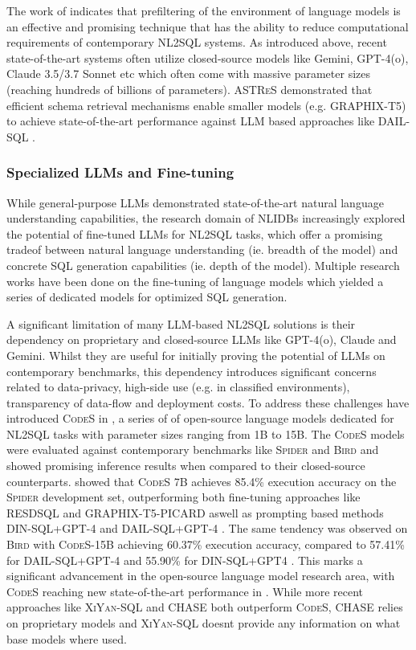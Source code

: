 The work of \citeauthor{RetAug} indicates that prefiltering of the environment of language models is an effective
and promising technique that has the ability to reduce computational requirements of contemporary NL2SQL systems.
As introduced above, recent state-of-the-art systems often utilize closed-source models like Gemini, GPT-4(o), Claude 3.5/3.7
Sonnet etc which often come with massive parameter sizes (reaching hundreds of billions of parameters). \textsc{ASTReS}
demonstrated that efficient schema retrieval mechanisms enable smaller models (e.g. GRAPHIX-T5) to achieve state-of-the-art
performance against LLM based approaches like DAIL-SQL \citep{DAIL-SQL, RetAug}.

\subsubsection{Specialized LLMs and Fine-tuning}

While general-purpose LLMs demonstrated state-of-the-art natural language understanding capabilities, the research
domain of NLIDBs increasingly explored the potential of fine-tuned LLMs for NL2SQL tasks, which offer a promising
tradeof between natural language understanding (ie. breadth of the model) and concrete SQL generation capabilities
(ie. depth of the model). Multiple research works have been done on the fine-tuning of language models which
yielded a series of dedicated models for optimized SQL generation.

A significant limitation of many LLM-based NL2SQL solutions is their dependency on proprietary and closed-source
LLMs like GPT-4(o), Claude and Gemini. Whilst they are useful for initially proving the potential of LLMs on
contemporary benchmarks, this dependency introduces significant concerns related to data-privacy, high-side use 
(e.g. in classified environments), transparency of data-flow and deployment costs. To address these challenges
\cite{CodeS} have introduced \textsc{CodeS} in \citeyear{CodeS}, a series of of open-source language models dedicated
for NL2SQL tasks with parameter sizes ranging from 1B to 15B. The \textsc{CodeS} models were evaluated against
contemporary benchmarks like \textsc{Spider} and \textsc{Bird} and showed promising inference results when compared
to their closed-source counterparts. \cite{CodeS} showed that \textsc{CodeS} 7B achieves 85.4\% execution accuracy
on the \textsc{Spider} development set, outperforming both fine-tuning approaches like RESDSQL and GRAPHIX-T5-PICARD
aswell as prompting based methods DIN-SQL+GPT-4 and DAIL-SQL+GPT-4 \citep{CodeS}. The same tendency was observed
on \textsc{Bird} with \textsc{CodeS}-15B achieving 60.37\% execution accuracy, compared to 57.41\% for DAIL-SQL+GPT-4
and 55.90\% for DIN-SQL+GPT4 \citep{CodeS}. This marks a significant advancement in the open-source language model
research area, with \textsc{CodeS} reaching new state-of-the-art performance in \citeyear{CodeS}. While more recent
approaches like \textsc{XiYan-SQL} and CHASE both outperform \textsc{CodeS}, CHASE relies on proprietary models and
\textsc{XiYan-SQL} doesnt provide any information on what base models where used.


